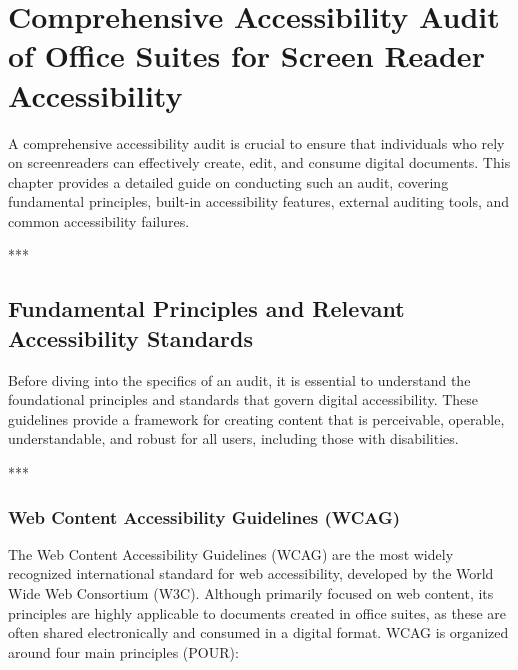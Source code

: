 \chapter{Comprehensive Accessibility Audit of Office Suites for Screen Reader Accessibility}
\label{cha:comprehensive-accessibility-audit-of-office-suites-for-screen-reader-accessibility}

A comprehensive \gls{accessibility} audit is crucial to ensure that individuals who rely on \gls{screenreader}s can effectively create, edit, and consume digital documents. This chapter provides a detailed guide on conducting such an audit, covering fundamental principles, built-in accessibility features, external auditing tools, and common accessibility failures.

***

\section{Fundamental Principles and Relevant Accessibility Standards}
\label{sec:fundamental-principles-and-relevant-accessibility-standards}

Before diving into the specifics of an audit, it is essential to understand the foundational principles and standards that govern digital accessibility. These guidelines provide a framework for creating content that is perceivable, operable, understandable, and robust for all users, including those with disabilities.

***

\subsection{Web Content Accessibility Guidelines (WCAG)}
\label{sub:web-content-accessibility-guidelines-wcag}

The Web Content Accessibility Guidelines (\gls{WCAG}) are the most widely recognized international standard for web accessibility, developed by the World Wide Web Consortium (W3C). Although primarily focused on web content, its principles are highly applicable to documents created in office suites, as these are often shared electronically and consumed in a digital format. \gls{WCAG} is organized around four main principles (POUR)\supercite{WCAGGuidelines}:

